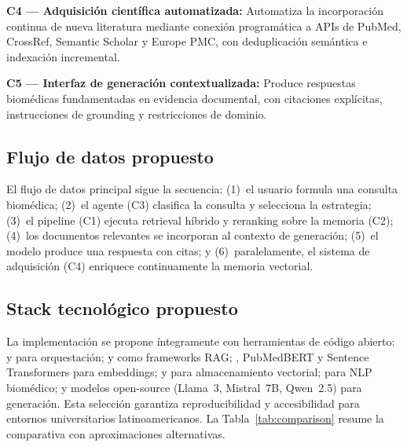 \textbf{C4 — Adquisición científica automatizada:} Automatiza la incorporación continua de nueva literatura mediante conexión programática a APIs de PubMed, CrossRef, Semantic Scholar y Europe PMC, con deduplicación semántica e indexación incremental.

\textbf{C5 — Interfaz de generación contextualizada:} Produce respuestas biomédicas fundamentadas en evidencia documental, con citaciones explícitas, instrucciones de grounding y restricciones de dominio.

\subsection{Flujo de datos propuesto}
\label{subsec:arch_flow}

El flujo de datos principal sigue la secuencia: (1)~el usuario formula una consulta biomédica; (2)~el agente (C3) clasifica la consulta y selecciona la estrategia; (3)~el pipeline (C1) ejecuta retrieval híbrido y reranking sobre la memoria (C2); (4)~los documentos relevantes se incorporan al contexto de generación; (5)~el modelo produce una respuesta con citas; y (6)~paralelamente, el sistema de adquisición (C4) enriquece continuamente la memoria vectorial.

\subsection{Stack tecnológico propuesto}
\label{subsec:arch_stack}

La implementación se propone íntegramente con herramientas de código abierto: \python{} y \fastapi{} para orquestación; \langchain{} y \llamaindex{} como frameworks RAG; \biobert{}, PubMedBERT y Sentence Transformers para embeddings; \faiss{} y \chromadb{} para almacenamiento vectorial; \scispacy{} para NLP biomédico; y modelos open-source (Llama~3, Mistral~7B, Qwen~2.5) para generación. Esta selección garantiza reproducibilidad y accesibilidad para entornos universitarios latinoamericanos. La Tabla~\ref{tab:comparison} resume la comparativa con aproximaciones alternativas.


